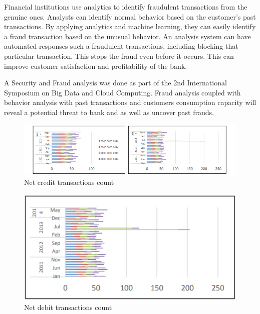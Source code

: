 \documentclass[sigconf]{acmart}
\begin{document}
Financial institutions use analytics to identify fraudulent transactions from the genuine ones. Analysts can identify normal behavior based on the customer's past transactions. By applying analytics and machine learning, they can easily identify a fraud transaction based on the unusual behavior.
An analysis system can have automated responses such a fraudulent transactions, including blocking that particular transaction. This stops the fraud even before it occurs. This can improve customer satisfaction and profitability of the bank\cite{5-big-data-use-cases-in-banking-and-financial-services}.

A Security and Fraud analysis was done as part of the  2nd International Symposium on Big Data and Cloud Computing. Fraud analysis coupled with behavior analysis with past transactions and customers consumption capacity will reveal a potential threat to bank and as well as uncover past frauds\cite{bigdata-banking}. 

\begin{figure}[htb]
  \centering
  \includegraphics[width=1.0\columnwidth]{images/Figure3.png}
  \caption{Net credit transactions count 
  \cite{bigdata-banking}}
  \label{fig:Figure3} 
\end{figure}

\begin{figure}[htb]
  \centering
  \includegraphics[width=1.0\columnwidth]{images/Figure4.png}
  \caption{Net debit transactions count
  \cite{bigdata-banking}}
  \label{fig:Figure4} 
\end{figure}
\end{document}
